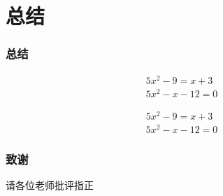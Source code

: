 \documentclass{beamer}%
\begin{document}
    \section{总结}
	\begin{frame}
		\frametitle{总结}	
		
		\begin{align}
			5x^2-9=x+3\\
			5x^2-x-12=0
		\end{align}
		
		
		\begin{align}
			5x^2-9=x+3\\
			5x^2-x-12=0
		\end{align}
	\end{frame}

	
	
	
	\begin{frame}
		\frametitle{ \kaishu\textbf{ 致谢}}
        请各位老师批评指正
	\end{frame}
	
	
	
\end{document}
